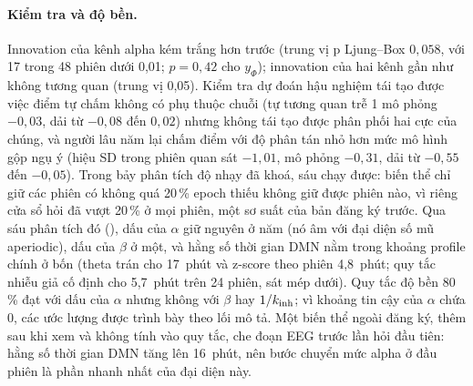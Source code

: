 \paragraph{Kiểm tra và độ bền.} Innovation của kênh alpha kém trắng hơn trước (trung vị p Ljung--Box $0{,}058$, với 17 trong 48 phiên dưới 0,01; $p=0{,}42$ cho $y_\Phi$); innovation của hai kênh gần như không tương quan (trung vị 0,05). Kiểm tra dự đoán hậu nghiệm tái tạo được việc điểm tự chấm không có phụ thuộc chuỗi (tự tương quan trễ 1 mô phỏng $-0{,}03$, dải từ $-0{,}08$ đến $0{,}02$) nhưng không tái tạo được phân phối hai cực của chúng, và người lâu năm lại chấm điểm với độ phân tán nhỏ hơn mức mô hình gộp ngụ ý (hiệu SD trong phiên quan sát $-1{,}01$, mô phỏng $-0{,}31$, dải từ $-0{,}55$ đến $-0{,}05$). Trong bảy phân tích độ nhạy đã khoá, sáu chạy được: biến thể chỉ giữ các phiên có không quá 20\,\% epoch thiếu không giữ được phiên nào, vì riêng cửa sổ hỏi đã vượt 20\,\% ở mọi phiên, một sơ suất của bản đăng ký trước. Qua sáu phân tích đó (), dấu của $\alpha$ giữ nguyên ở năm (nó âm với đại diện số mũ aperiodic), dấu của $\beta$ ở một, và hằng số thời gian DMN nằm trong khoảng profile chính ở bốn (theta trán cho 17~phút và z-score theo phiên 4,8~phút; quy tắc nhiễu giả cố định cho 5,7~phút trên 24 phiên, sát mép dưới). Quy tắc độ bền 80\,\% đạt với dấu của $\alpha$ nhưng không với $\beta$ hay $1/k_{\mathrm{inh}}$; vì khoảng tin cậy của $\alpha$ chứa 0, các ước lượng được trình bày theo lối mô tả. Một biến thể ngoài đăng ký, thêm sau khi xem  và không tính vào quy tắc, che đoạn EEG trước lần hỏi đầu tiên: hằng số thời gian DMN tăng lên 16~phút, nên bước chuyển mức alpha ở đầu phiên là phần nhanh nhất của đại diện này.

